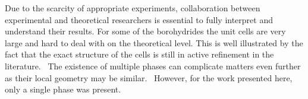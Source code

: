 Due to the scarcity of appropriate experiments, collaboration between experimental and theoretical researchers is essential to fully interpret and understand their results.
For some of the borohydrides the unit cells are very large and hard to deal with on the theoretical level.
This is well illustrated by the fact that the exact structure of the cells is still in active refinement in the literature.~\cite{cabh42-structure-p42m, cabh42-structure-p4}
The existence of multiple phases can complicate matters even further as their local geometry may be similar.~\cite{mgbh42-structure-fdd, mgbh42-phases-2007, mgbh42-phases-2008, mgbh42-phases-2009,}
However, for the work presented here, only a single phase was present.



